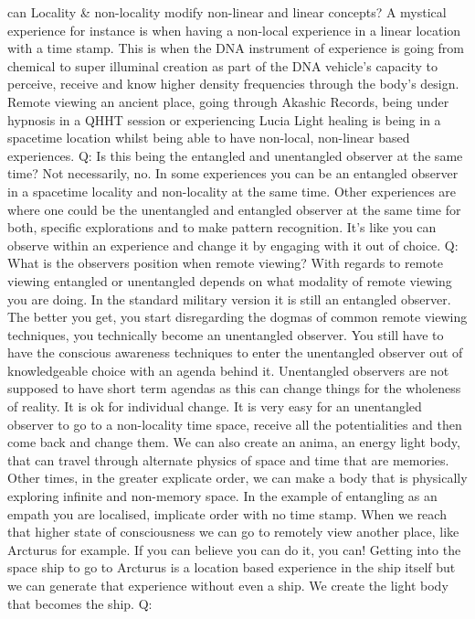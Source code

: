 can Locality \& non-locality modify non-linear and linear concepts? A
mystical experience for instance is when having a non-local experience
in a linear location with a time stamp. This is when the DNA instrument
of experience is going from chemical to super illuminal creation as part
of the DNA vehicle's capacity to perceive, receive and know higher
density frequencies through the body's design. Remote viewing an ancient
place, going through Akashic Records, being under hypnosis in a QHHT
session or experiencing Lucia Light healing is being in a spacetime
location whilst being able to have non-local, non-linear based
experiences. Q: Is this being the entangled and unentangled observer at
the same time? Not necessarily, no. In some experiences you can be an
entangled observer in a spacetime locality and non-locality at the same
time. Other experiences are where one could be the unentangled and
entangled observer at the same time for both, specific explorations and
to make pattern recognition. It's like you can observe within an
experience and change it by engaging with it out of choice. Q: What is
the observers position when remote viewing? With regards to remote
viewing entangled or unentangled depends on what modality of remote
viewing you are doing. In the standard military version it is still an
entangled observer. The better you get, you start disregarding the
dogmas of common remote viewing techniques, you technically become an
unentangled observer. You still have to have the conscious awareness
techniques to enter the unentangled observer out of knowledgeable choice
with an agenda behind it. Unentangled observers are not supposed to have
short term agendas as this can change things for the wholeness of
reality. It is ok for individual change. It is very easy for an
unentangled observer to go to a non-locality time space, receive all the
potentialities and then come back and change them. We can also create an
anima, an energy light body, that can travel through alternate physics
of space and time that are memories. Other times, in the greater
explicate order, we can make a body that is physically exploring
infinite and non-memory space. In the example of entangling as an empath
you are localised, implicate order with no time stamp. When we reach
that higher state of consciousness we can go to remotely view another
place, like Arcturus for example. If you can believe you can do it, you
can! Getting into the space ship to go to Arcturus is a location based
experience in the ship itself but we can generate that experience
without even a ship. We create the light body that becomes the ship. Q:
